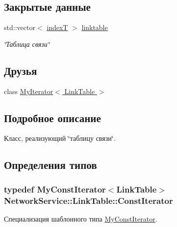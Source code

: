 \subsection*{Закрытые данные}
\begin{DoxyCompactItemize}
\item 
std\+::vector$<$ \hyperlink{class_network_service_1_1_link_table_a5a0e870806128a79b9947a7ea496fe9e}{index\+T} $>$ \hyperlink{class_network_service_1_1_link_table_ac5650261ad60d19bb35235b2c4c9a284}{linktable}
\begin{DoxyCompactList}\small\item\em \char`\"{}Таблица связи\char`\"{} \end{DoxyCompactList}\end{DoxyCompactItemize}
\subsection*{Друзья}
\begin{DoxyCompactItemize}
\item 
class \hyperlink{class_network_service_1_1_link_table_a4a2eea20b7b16255ee50c0b05accd544}{My\+Iterator$<$ Link\+Table $>$}
\end{DoxyCompactItemize}


\subsection{Подробное описание}
Класс, реализующий \char`\"{}таблицу связи\char`\"{}. 

\subsection{Определения типов}
\hypertarget{class_network_service_1_1_link_table_a2414daadb1745ec3039bba9810c8a23d}{}
\subsubsection[{Const\+Iterator}]{\setlength{\rightskip}{0pt plus 5cm}typedef {\bf My\+Const\+Iterator}$<${\bf Link\+Table}$>$ {\bf Network\+Service\+::\+Link\+Table\+::\+Const\+Iterator}}\label{class_network_service_1_1_link_table_a2414daadb1745ec3039bba9810c8a23d}


Специализация шаблонного типа \hyperlink{class_network_service_1_1_my_const_iterator}{My\+Const\+Iterator}. 

